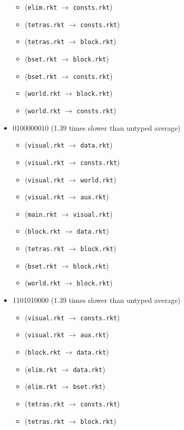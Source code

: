 \documentclass{article}
\newcommand{\mono}[1]{\texttt{#1}}
\begin{document}
\begin{itemize}
\begin{itemize}
  \item (\mono{elim.rkt} $\rightarrow$ \mono{consts.rkt})
  \item (\mono{tetras.rkt} $\rightarrow$ \mono{consts.rkt})
  \item (\mono{tetras.rkt} $\rightarrow$ \mono{block.rkt})
  \item (\mono{bset.rkt} $\rightarrow$ \mono{block.rkt})
  \item (\mono{bset.rkt} $\rightarrow$ \mono{consts.rkt})
  \item (\mono{world.rkt} $\rightarrow$ \mono{block.rkt})
  \item (\mono{world.rkt} $\rightarrow$ \mono{consts.rkt})
  \end{itemize}
\item 0100000010 (1.39 times slower than untyped average)
  \begin{itemize}
  \item (\mono{visual.rkt} $\rightarrow$ \mono{data.rkt})
  \item (\mono{visual.rkt} $\rightarrow$ \mono{consts.rkt})
  \item (\mono{visual.rkt} $\rightarrow$ \mono{world.rkt})
  \item (\mono{visual.rkt} $\rightarrow$ \mono{aux.rkt})
  \item (\mono{main.rkt} $\rightarrow$ \mono{visual.rkt})
  \item (\mono{block.rkt} $\rightarrow$ \mono{data.rkt})
  \item (\mono{tetras.rkt} $\rightarrow$ \mono{block.rkt})
  \item (\mono{bset.rkt} $\rightarrow$ \mono{block.rkt})
  \item (\mono{world.rkt} $\rightarrow$ \mono{block.rkt})
  \end{itemize}
\item 1101010000 (1.39 times slower than untyped average)
  \begin{itemize}
  \item (\mono{visual.rkt} $\rightarrow$ \mono{consts.rkt})
  \item (\mono{visual.rkt} $\rightarrow$ \mono{aux.rkt})
  \item (\mono{block.rkt} $\rightarrow$ \mono{data.rkt})
  \item (\mono{elim.rkt} $\rightarrow$ \mono{data.rkt})
  \item (\mono{elim.rkt} $\rightarrow$ \mono{bset.rkt})
  \item (\mono{tetras.rkt} $\rightarrow$ \mono{consts.rkt})
  \item (\mono{tetras.rkt} $\rightarrow$ \mono{block.rkt})

\end{itemize}
\end{itemize}
\end{document}
